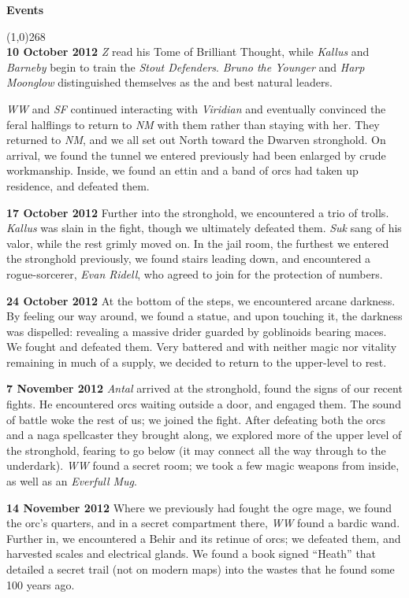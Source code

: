 \documentclass[letterpaper]{article}
\newcommand{\colline}{\line(1,0){268} \\}
\newcommand{\e}[1]{\emph{#1}}
\newcommand{\B}[1]{\textbf{#1}}
\newenvironment{notesection}[1]
{ {\huge \B{#1}} \par
\vspace{-0.75em}
\colline
\begingroup\fontsize{9pt}{12pt}\selectfont}
{\endgroup}
\begin{document}
\begin{notesection}{Events}
\B{10 October 2012} \e{Z} read his Tome of Brilliant Thought, while \e{Kallus} and \e{Barneby} begin to train the \e{Stout Defenders}. \e{Bruno the Younger} and \e{Harp Moonglow} distinguished themselves as the and best natural leaders.

\e{WW} and \e{SF} continued interacting with \e{Viridian} and eventually convinced the feral halflings to return to \e{NM} with them rather than staying with her. They returned to \e{NM}, and we all set out North toward the Dwarven stronghold. On arrival, we found the tunnel we entered previously had been enlarged by crude workmanship. Inside, we found an ettin and a band of orcs had taken up residence, and defeated them. 

\B{17 October 2012} Further into the stronghold, we encountered a trio of trolls.  \e{Kallus} was slain in the fight, though we ultimately defeated them. \e{Suk} sang of his valor, while the rest grimly moved on. In the jail room, the furthest we entered the stronghold previously, we found stairs leading down, and encountered a rogue-sorcerer, \e{Evan Ridell}, who agreed to join for the protection of numbers.

\B{24 October 2012} At the bottom of the steps, we encountered arcane darkness. By feeling our way around, we found a statue, and upon touching it, the darkness was dispelled: revealing a massive drider guarded by goblinoids bearing maces. We fought and defeated them. Very battered and with neither magic nor vitality remaining in much of a supply, we decided to return to the upper-level to rest.

\B{7 November 2012} \e{Antal} arrived at the stronghold, found the signs of our recent fights. He encountered orcs waiting outside a door, and engaged them. The sound of battle woke the rest of us; we joined the fight. After defeating both the orcs and a naga spellcaster they brought along, we explored more of the upper level of the stronghold, fearing to go below (it may connect all the way through to the underdark). \e{WW} found a secret room; we took a few magic weapons from inside, as well as an \e{Everfull Mug}. 

\B{14 November 2012} Where we previously had fought the ogre mage, we found the orc's quarters, and in a secret compartment there, \e{WW} found a bardic wand. Further in, we encountered a Behir and its retinue of orcs; we defeated them, and harvested scales and electrical glands.  We found a book signed ``Heath'' that detailed a secret trail (not on modern maps) into the wastes that he found some 100 years ago.


\end{notesection}
\end{document}
